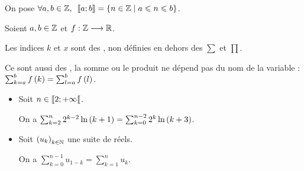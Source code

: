 \begin{nota}
On pose \(\quantifs{\forall a,b\in\Z}\interventierii{a}{b}=\accol{n\in\Z\tq a\leq n\leq b}\).
\end{nota}

\begin{nota}
Soient \(a,b\in\mathbb{Z}\) et \(f:\mathbb{Z}\longrightarrow\mathbb{R}\).

\end{nota}

\begin{rem}
Les indices \(k\) et \(x\) sont des , non définies en dehors des \(\sum\) et \(\prod\).

Ce sont aussi des , la somme ou le produit ne dépend pas du nom de la variable : \(\sum_{k=a}^b f\left(k\right)=\sum_{l=a}^b f\left(l\right)\).
\end{rem}

\begin{rem}
\begin{itemize}
\item Soit \(n\in\left\llbracket2;+\infty\right\llbracket\).

On a \(\sum_{k=2}^n2^{k-2}\ln\left(k+1\right)=\sum_{k=0}^{n-2}2^k\ln\left(k+3\right)\).

\item Soit \(\left(u_k\right)_{k\in\mathbb{N}}\) une suite de réels.

On a \(\sum_{k=0}^{n-1}u_{1-k}=\sum_{k=1}^n u_k\).
\end{itemize}
\end{rem}

